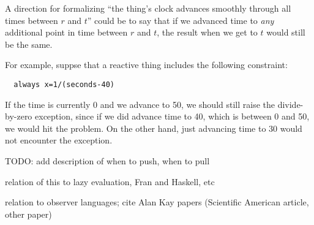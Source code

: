 \documentclass{article}
\begin{document}
A direction for formalizing ``the thing's clock advances smoothly through
all times between $r$ and $t$'' could be to say that if we advanced time to
\emph{any} additional point in time between $r$ and $t$, the result when we
get to $t$ would still be the same.

For example, suppse that a reactive thing includes the following constraint:
\begin{verbatim}
  always x=1/(seconds-40)
\end{verbatim}

If the time is currently 0 and we advance to 50, we should still raise the
divide-by-zero exception, since if we did advance time to 40, which is
between 0 and 50, we would hit the problem.  On the other hand, just
advancing time to 30 would not encounter the exception.

TODO: add description of when to push, when to pull

relation of this to lazy evaluation, Fran and Haskell, etc

relation to observer languages; cite Alan Kay papers (Scientific American
article, other paper)
\end{document}
